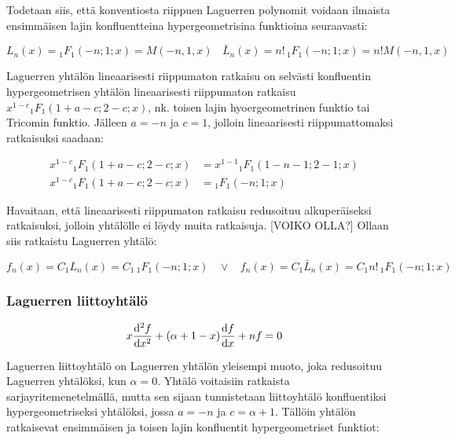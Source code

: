 \documentclass[../johdoksia.tex]{subfiles}
\begin{document}
	Todetaan siis, että konventiosta riippuen Laguerren polynomit voidaan ilmaista ensimmäisen lajin konfluentteina hypergeometrisina funktioina seuraavasti:
	
	\begin{equation}
		\boxed{L_n(x) = {_1{F}_1}(-n; 1; x) = M(-n, 1, x) \ \ \ \ \bar{L}_n(x) = n!\,{_1{F}_1}(-n; 1; x) = n!M(-n, 1, x)}
	\end{equation}

	Laguerren yhtälön lineaarisesti riippumaton ratkaisu on selvästi konfluentin hypergeometrisen yhtälön lineaarisesti riippumaton ratkaisu $x^{1-c}{_1{F}_1}(1 + a - c; 2 - c; x)$, nk. toisen lajin hyoergeometrinen funktio tai Tricomin funktio. Jälleen $a = -n$ ja $c = 1$, jolloin lineaarisesti riippumattomaksi ratkaisuksi saadaan:
	
	\begin{align*}
		x^{1-c}{_1{F}_1}(1 + a - c; 2 - c; x) &= x^{1-1}{_1{F}_1}(1 - n - 1; 2 - 1; x) \\
		x^{1-c}{_1{F}_1}(1 + a - c; 2 - c; x) &= {_1{F}_1}(- n; 1; x)
	\end{align*}

	Havaitaan, että lineaarisesti riippumaton ratkaisu redusoituu alkuperäiseksi ratkaisuksi, jolloin yhtälölle ei löydy muita ratkaisuja. [VOIKO OLLA?] Ollaan siis ratkaistu Laguerren yhtälö:
	
	\begin{equation}
		\boxed{f_n(x) = C_1L_n(x) = C_1\,{_1{F}_1}(-n; 1; x) \ \ \ \ \lor \ \ \ \ f_n(x) = C_1\bar{L}_n(x) = C_1n!\,{_1{F}_1}(-n; 1; x)}
	\end{equation}
	
	\subsubsection{Laguerren liittoyhtälö}
	
	\begin{equation}
		x\odv{^2f}{x^2} + (\alpha + 1 - x)\odv{f}{x} + nf = 0
	\end{equation}

	Laguerren liittoyhtälö on Laguerren yhtälön yleisempi muoto, joka redusoituu Laguerren yhtälöksi, kun $\alpha = 0$. Yhtälö voitaisiin ratkaista sarjayritemenetelmällä, mutta sen sijaan tunnistetaan liittoyhtälö konfluentiksi hypergeometriseksi yhtälöksi, jossa $a = -n$ ja $c = \alpha + 1$. Tällöin yhtälön ratkaisevat ensimmäisen ja toisen lajin konfluentit hypergeometriset funktiot:
	
\end{document}
